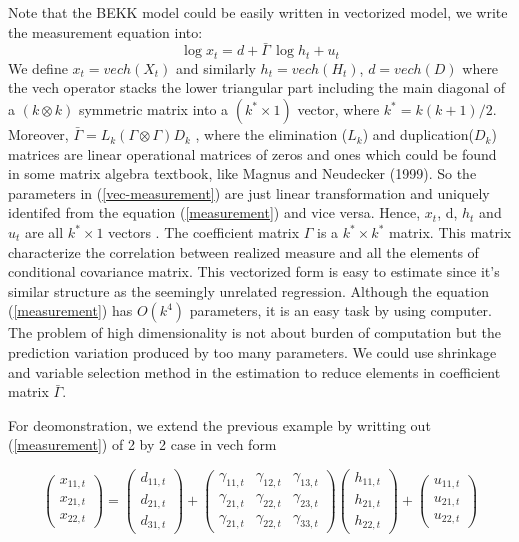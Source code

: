 \documentclass[titlepage,11pt]{article}
\begin{document}
Note that the BEKK model could be easily written in vectorized model, we write the measurement equation into:
\begin{equation}
\label{vec-measurement}
\log x_t= d+ \bar{\Gamma} \,  \log h_{t}+ u_{t}
\end{equation}
We define $x_t = vech( X_t)$ and similarly $h_t = vech( H_t)$, $d = vech(D)$ where the vech operator stacks the lower triangular part including the main diagonal of a $(k \otimes k)$ symmetric matrix into a $(k^* \times 1)$  vector, where $k^*= k(k+1)/2$. Moreover, $\bar{\Gamma} = L_k(\Gamma\otimes \Gamma)D_k$ , where the elimination ($L_k$) and duplication($D_k$) matrices are linear operational matrices of zeros and ones which could be found in some matrix algebra textbook, like Magnus and Neudecker (1999).  So the parameters in (\ref{vec-measurement}) are just linear transformation and uniquely identifed from the equation (\ref{measurement}) and vice versa. 
Hence, $x_t$, d, $h_t$ and $u_t$ are all  $k^* \times 1$ vectors .  The coefficient matrix $\Gamma$ is a $k^* \times k^*$ matrix.  This matrix characterize the correlation between realized measure and all the elements of conditional covariance matrix. This vectorized form is easy to estimate since it's similar structure as the seemingly unrelated regression. Although the equation (\ref{measurement})  has $O(k^4)$ parameters, it is an easy task by using computer. The problem of high dimensionality is not about  burden of computation but the prediction variation produced by too many parameters. We could use shrinkage and variable selection method in the estimation to reduce elements in coefficient matrix $\bar{\Gamma}$.


For deomonstration, we extend the previous example by writting out (\ref{measurement}) of 2 by 2 case in vech form 

\begin{equation*}
\left(\begin{array}{c}
x_{11,t}  \\
x_{21,t} \\
x_{22,t}\end{array}\right) = 
\left( \begin{array}{c}
d_{11,t}  \\
d_{21,t} \\
d_{31,t}\end{array}\right)
+ \left( \begin{array}{ccc}
\gamma_{11,t} & \gamma_{12,t}  & \gamma_{13,t} \\
\gamma_{21,t} & \gamma_{22,t}  & \gamma_{23,t} \\
\gamma_{21,t} & \gamma_{22,t}  & \gamma_{33,t}
\end{array} \right) 
\left(\begin{array}{c}
h_{11,t} \\
h_{21,t} \\
h_{22,t}
\end{array}\right)
+ \left(\begin{array}{c}
u_{11,t} \\
u_{21,t} \\
u_{22,t}
\end{array} \right)
\end{equation*}
\end{document}
